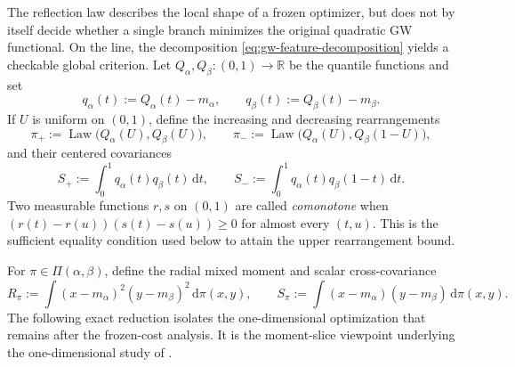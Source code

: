 \documentclass[11pt,a4paper]{article}
\theoremstyle{definition}
\theoremstyle{remark}
\newcommand{\R}{\mathbb R}
\newcommand{\Piopt}{\Pi}
\newcommand{\dd}{\,\mathrm d}
\begin{document}
The reflection law describes the local shape of a frozen optimizer, but does
not by itself decide whether a single branch minimizes the original quadratic
GW functional.  On the line, the decomposition
\eqref{eq:gw-feature-decomposition} yields a checkable global criterion.  Let
\(Q_\alpha,Q_\beta:(0,1)\to\R\) be the quantile functions and set
\begin{equation}
  q_\alpha(t):=Q_\alpha(t)-m_\alpha,
  \qquad
  q_\beta(t):=Q_\beta(t)-m_\beta.
  \label{eq:p2-centered-quantiles}
\end{equation}
If \(U\) is uniform on \((0,1)\), define the increasing and decreasing
rearrangements
\begin{equation}
  \pi_+:=\operatorname{Law}\bigl(Q_\alpha(U),Q_\beta(U)\bigr),
  \qquad
  \pi_-:=\operatorname{Law}\bigl(Q_\alpha(U),Q_\beta(1-U)\bigr),
  \label{eq:p2-monotone-couplings}
\end{equation}
and their centered covariances
\begin{equation}
  S_+:=\int_0^1q_\alpha(t)q_\beta(t)\dd t,
  \qquad
  S_-:=\int_0^1q_\alpha(t)q_\beta(1-t)\dd t.
  \label{eq:p2-extreme-quantile-covariances}
\end{equation}
Two measurable functions \(r,s\) on \((0,1)\) are called
\emph{comonotone} when
\(
 (r(t)-r(u))(s(t)-s(u))\geq0
\)
for almost every \((t,u)\).  This is the sufficient equality condition used
below to attain the upper rearrangement bound.

For \(\pi\in\Piopt(\alpha,\beta)\), define the radial mixed moment and scalar
cross-covariance
\begin{equation}
  R_\pi:=\int (x-m_\alpha)^2(y-m_\beta)^2\dd\pi(x,y),
  \qquad
  S_\pi:=\int (x-m_\alpha)(y-m_\beta)\dd\pi(x,y).
  \label{eq:p2-one-dimensional-two-moments}
\end{equation}
The following exact reduction isolates the one-dimensional optimization that
remains after the frozen-cost analysis.  It is the moment-slice viewpoint
underlying the one-dimensional study of
\citet{DumontLacombeVialard2025}.
\end{document}
